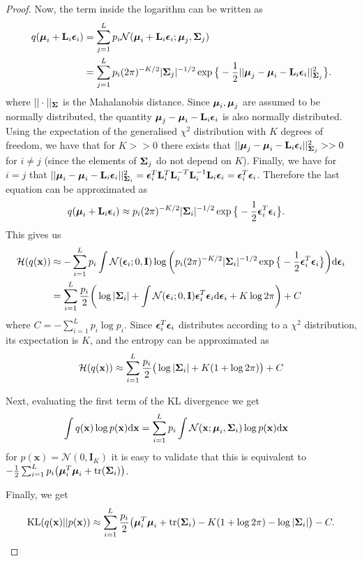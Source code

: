 \documentclass{article} %
\newcommand{\N}{\mathcal{N}}
\newcommand{\td}{\text{d}}
\newcommand{\x}{\mathbf{x}}
\newcommand{\bL}{\mathbf{L}}
\newcommand{\I}{\mathbf{I}}
\newcommand{\bepsilon}{\text{\boldmath$\epsilon$}}
\newcommand{\bSigma}{\text{\boldmath$\Sigma$}}
\newcommand{\bmu}{\text{\boldmath$\mu$}}
\newcommand{\tr}{\text{tr}}
\newcommand{\KL}{\text{KL}}
\theoremstyle{definition}
\begin{document}
\begin{proof}
Now, the term inside the logarithm can be written as 
\begin{align*}
q(\bmu_i + \bL_i \bepsilon_{i}) &= \sum_{j=1}^L p_i \N(\bmu_i + \bL_i \bepsilon_{i}; \bmu_j, \bSigma_j) \\
&= \sum_{j=1}^L p_i (2 \pi)^{-K/2} |\bSigma_j|^{-1/2} \exp \big\{ -\frac{1}{2} || \bmu_j - \bmu_i - \bL_i \bepsilon_{i} ||^2_{\bSigma_j} \big\}.
\end{align*}
where $|| \cdot ||_{\bSigma}$ is the Mahalanobis distance.
Since $\bmu_i,\bmu_j$ are assumed to be normally distributed, the quantity $\bmu_j - \bmu_i - \bL_i \bepsilon_{i}$ is also normally distributed. Using the expectation of the generalised $\chi^2$ distribution with $K$ degrees of freedom, we have that for $K >> 0$ there exists that $|| \bmu_j - \bmu_i - \bL_i \bepsilon_{i} ||^2_{\bSigma_j} >> 0$ for $i \neq j$ (since the elements of $\bSigma_j$ do not depend on $K$).
Finally, we have for $i = j$ that $|| \bmu_i - \bmu_i - \bL_i \bepsilon_{i} ||^2_{\bSigma_i} = \bepsilon_{i}^T \bL_i^T \bL_i^{-T} \bL^{-1}_i \bL_i \bepsilon_{i} = \bepsilon_{i}^T \bepsilon_{i}$. Therefore the last equation can be approximated as
\begin{align*}
&q(\bmu_i + \bL_i \bepsilon_{i}) 
\approx p_i (2 \pi)^{-K/2} |\bSigma_i|^{-1/2} \exp \big\{ -\frac{1}{2} \bepsilon_{i}^T \bepsilon_{i} \big\}.
\end{align*}
This gives us 
\begin{align*}
\mathcal{H}(q(\x)) &\approx- \sum_{i=1}^L p_i \int \N(\bepsilon_i; 0, \I)\log \bigg( p_i (2 \pi)^{-K/2} |\bSigma_i|^{-1/2} \exp \big\{ -\frac{1}{2} \bepsilon_{i}^T \bepsilon_{i} \big\} \bigg) \td \bepsilon_i \\
&= \sum_{i=1}^L \frac{p_i}{2} \bigg( \log |\bSigma_i| + \int \N(\bepsilon_i; 0, \I) \bepsilon_{i}^T \bepsilon_{i} \td \bepsilon_i + K \log 2 \pi \bigg)
+ C
\end{align*}
where $C = - \sum_{i=1}^L p_i \log p_i$.
Since $\bepsilon_{i}^T \bepsilon_{i}$ distributes according to a $\chi^2$ distribution, its expectation is $K$, and the entropy can be approximated as 
\begin{align*}
\mathcal{H}(q(\x)) \approx \sum_{i=1}^L \frac{p_i}{2} \big( \log |\bSigma_i| + K (1+\log 2 \pi) \big) + C
\end{align*}

Next, evaluating the first term of the KL divergence we get
\begin{align*}
\int q(\x) \log p(\x) \td \x &= \sum_{i=1}^L p_i \int  \N(\x; \bmu_i, \bSigma_i) \log p(\x) \td \x
\end{align*}
for $p(\x) = \N(0, \I_K)$ it is easy to validate that this is equivalent to
$-\frac{1}{2} \sum_{i=1}^L p_i \big( \bmu_i^T \bmu_i + \tr ( \bSigma_i ) \big)$.

Finally, we get 
\begin{align*}
\KL(q(\x) || p(\x)) \approx
\sum_{i=1}^L \frac{p_i}{2} \big( \bmu_i^T \bmu_i + \tr(\bSigma_i) - K(1+\log 2 \pi) - \log | \bSigma_i | \big) - C.
\end{align*}
\end{proof}
\end{document}
